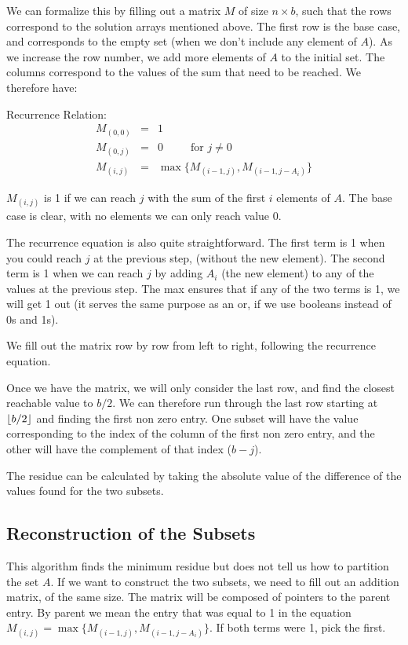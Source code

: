 \documentclass[11pt]{article}
\DeclarePairedDelimiter\floor{\lfloor}{\rfloor}
\begin{document}
We can formalize this by filling out a matrix $M$ of size $n\times b$, such that the rows correspond to the solution arrays mentioned above. The first row is the base case, and corresponds to the empty set (when we don't include any element of $A$). As we increase the row number, we add more elements of $A$ to the initial set. The columns correspond to the values of the sum that need to be reached.
We therefore have:

Recurrence Relation:
\begin{eqnarray}
M_{(0,0)} &=& 1\\
M_{(0,j)} &=& 0 \;\;\;\;\;\;\;\;\;\text{for $j \neq 0$}\\
M_{(i,j)}&=&\max\{M_{(i-1,j)},M_{(i-1,j-A_i)}\}
\end{eqnarray}

$M_{(i,j)}$ is 1 if we can reach $j$ with the sum of the first $i$ elements of $A$. The base case is clear, with no elements we can only reach value 0.

The recurrence equation is also quite straightforward. The first term is 1 when you could reach $j$ at the previous step, (without the new element). The second term is 1 when we can reach $j$ by adding $A_i$ (the new element) to any of the values at the previous step. The max ensures that if any of the two terms is 1, we will get 1 out (it serves the same purpose as an or, if we use booleans instead of 0s and 1s).

We fill out the matrix row by row from left to right, following the recurrence equation.

Once we have the matrix, we will only consider the last row, and find the closest reachable value to $b/2$. We can therefore run through the last row starting at $\floor*{b/2}$ and finding the first non zero entry. One subset will have the value corresponding to the index of the column of the first non zero entry, and the other will have the complement of that index ($b-j$).

The residue can be calculated by taking the absolute value of the difference of the values found for the two subsets.

\subsection{Reconstruction of the Subsets}
This algorithm finds the minimum residue but does not tell us how to partition the set $A$. If we want to construct the two subsets, we need to fill out an addition matrix, of the same size. The matrix will be composed of pointers to the parent entry. By parent we mean the entry that was equal to 1 in the equation $M_{(i,j)}=\max\{M_{(i-1,j)},M_{(i-1,j-A_i)}\}$. If both terms were 1, pick the first.
\end{document}
